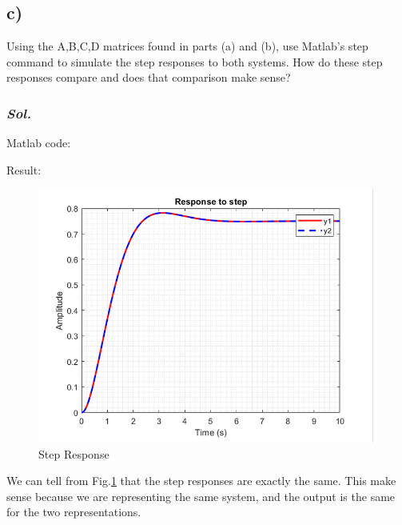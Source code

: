     \subsection{c)}
    Using the A,B,C,D matrices found in parts (a) and (b), use Matlab's step command to simulate the step responses to both systems. How do these step responses compare and does that comparison make sense? 
    \subsubsection{\textit{ Sol. }}
    Matlab code:
    
    Result:
    \begin{figure}[htp]
        \centering
        \includegraphics[width=15cm]{images/Q1_c_fig.png}
        \caption{Step Response}
        \label{fig:Q1c}
    \end{figure}

    We can tell from Fig.\ref{fig:Q1c} that the step responses are exactly the same.
    This make sense because we are representing the same system, and the output is the same for the two representations. 

\pagebreak
